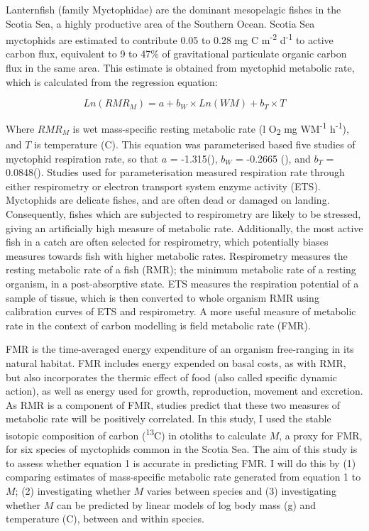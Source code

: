 \documentclass[12pt, titlepage]{article}
\begin{document}
Lanternfish (family Myctophidae) are the dominant mesopelagic fishes in the Scotia Sea, a highly productive area of the Southern Ocean. %
Scotia Sea myctophids are estimated to contribute 0.05 to 0.28 mg C m\textsuperscript{-2} d\textsuperscript{-1} to active carbon flux, equivalent to 9 to 47\% of gravitational particulate organic carbon flux in the same area. %
This estimate is obtained from myctophid metabolic rate, which is calculated from the regression equation:

\begin{equation}
Ln(RMR_{M}) = a + b_{W} \times Ln(WM) + b_{T} \times T
\end{equation}

\noindent Where $RMR_{M}$ is wet mass-specific resting metabolic rate (\textmu l O\textsubscript{2} mg WM\textsuperscript{-1} h\textsuperscript{-1}), and $T$ is temperature (\textdegree C).
This equation was parameterised based five studies of myctophid respiration rate, so that $a$ = -1.315(), $b_{W}$ = -0.2665 (), and $b_{T}$ = 0.0848().
Studies used for parameterisation measured respiration rate through either respirometry or electron transport system enzyme activity (ETS). %
Myctophids are delicate fishes, and are often dead or damaged on landing.
Consequently, fishes which are subjected to respirometry are likely to be stressed, giving an artificially high measure of metabolic rate.
Additionally, the most active fish in a catch are often selected for respirometry, which potentially biases measures towards fish with higher metabolic rates. %
Respirometry measures the resting metabolic rate of a fish (RMR); the minimum metabolic rate of a resting organism, in a post-absorptive state. %
ETS measures the respiration potential of a sample of tissue, which is then converted to whole organism RMR using calibration curves of ETS and respirometry. %
A more useful measure of metabolic rate in the context of carbon modelling is field metabolic rate (FMR).

FMR is the time-averaged energy expenditure of an organism free-ranging in its natural habitat.
FMR includes energy expended on basal costs, as with RMR, but also incorporates the thermic effect of food (also called specific dynamic action), as well as energy used for growth, reproduction, movement and excretion. %
As RMR is a component of FMR, studies predict that these two measures of metabolic rate will be positively correlated. %
In this study, I used the stable isotopic composition of carbon (\textdelta \textsuperscript{13}C) in otoliths to calculate $M$, a proxy for FMR, %
for six species of myctophids common in the Scotia Sea. %
The aim of this study is to assess whether equation 1 is accurate in predicting FMR.
I will do this by (1) comparing estimates of mass-specific metabolic rate generated from equation 1 to $M$; (2) investigating whether $M$ varies between species and (3) investigating whether $M$ can be predicted by linear models of log body mass (g) and temperature (\textdegree C), between and within species.
\end{document}
